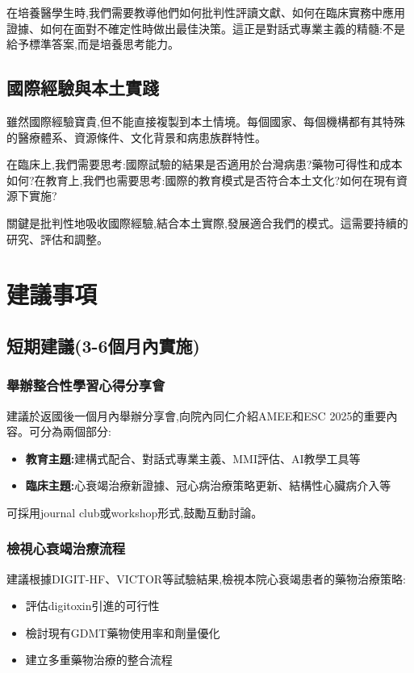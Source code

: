 \documentclass[12pt,a4paper]{article}
\begin{document}
在培養醫學生時,我們需要教導他們如何批判性評讀文獻、如何在臨床實務中應用證據、如何在面對不確定性時做出最佳決策。這正是對話式專業主義的精髓:不是給予標準答案,而是培養思考能力。

\subsection{國際經驗與本土實踐}

雖然國際經驗寶貴,但不能直接複製到本土情境。每個國家、每個機構都有其特殊的醫療體系、資源條件、文化背景和病患族群特性。

在臨床上,我們需要思考:國際試驗的結果是否適用於台灣病患?藥物可得性和成本如何?在教育上,我們也需要思考:國際的教育模式是否符合本土文化?如何在現有資源下實施?

關鍵是批判性地吸收國際經驗,結合本土實際,發展適合我們的模式。這需要持續的研究、評估和調整。

\section{建議事項}

\subsection{短期建議(3-6個月內實施)}

\subsubsection{舉辦整合性學習心得分享會}

建議於返國後一個月內舉辦分享會,向院內同仁介紹AMEE和ESC 2025的重要內容。可分為兩個部分:
\begin{itemize}[nosep]
    \item \textbf{教育主題:}建構式配合、對話式專業主義、MMI評估、AI教學工具等
    \item \textbf{臨床主題:}心衰竭治療新證據、冠心病治療策略更新、結構性心臟病介入等
\end{itemize}

可採用journal club或workshop形式,鼓勵互動討論。

\subsubsection{檢視心衰竭治療流程}

建議根據DIGIT-HF、VICTOR等試驗結果,檢視本院心衰竭患者的藥物治療策略:
\begin{itemize}[nosep]
    \item 評估digitoxin引進的可行性
    \item 檢討現有GDMT藥物使用率和劑量優化
    \item 建立多重藥物治療的整合流程
\end{itemize}
\end{document}
